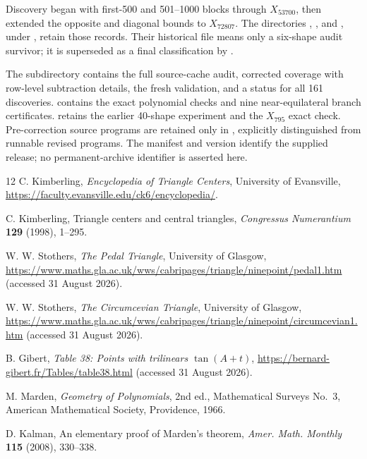 \documentclass[11pt]{article}
\begin{document}
Discovery began with first-500 and 501--1000 blocks through $X_{53700}$,
then extended the opposite and diagonal bounds to $X_{72807}$.
The directories ,
, and , under
, retain those records.  Their historical file
 means only a six-shape audit survivor;
it is superseded as a final classification by
.

The subdirectory  contains the full source-cache
audit, corrected coverage with row-level subtraction details, the fresh
validation, and a status for all 161 discoveries.
 contains the exact polynomial checks and
nine near-equilateral branch certificates.
 retains the earlier 40-shape experiment and the
$X_{795}$ exact check.
Pre-correction source programs are retained only in
, explicitly distinguished from runnable revised
programs.  The manifest and version identify the supplied release;
no permanent-archive identifier is asserted here.

\begin{thebibliography}{12}
\footnotesize
\setlength{\itemsep}{0pt}
C. Kimberling, \emph{Encyclopedia of Triangle Centers}, University of
Evansville, \url{https://faculty.evansville.edu/ck6/encyclopedia/}.

C. Kimberling, Triangle centers and central triangles,
\emph{Congressus Numerantium} \textbf{129} (1998), 1--295.

W. W. Stothers, \emph{The Pedal Triangle}, University of Glasgow,
\url{https://www.maths.gla.ac.uk/wws/cabripages/triangle/ninepoint/pedal1.htm}
(accessed 31 August 2026).

W. W. Stothers, \emph{The Circumcevian Triangle}, University of Glasgow,
\url{https://www.maths.gla.ac.uk/wws/cabripages/triangle/ninepoint/circumcevian1.htm}
(accessed 31 August 2026).

B. Gibert, \emph{Table 38: Points with trilinears $\tan(A+t)$},
\url{https://bernard-gibert.fr/Tables/table38.html}
(accessed 31 August 2026).

M. Marden, \emph{Geometry of Polynomials}, 2nd ed., Mathematical Surveys
No.~3, American Mathematical Society, Providence, 1966.

D. Kalman, An elementary proof of Marden's theorem,
\emph{Amer. Math. Monthly} \textbf{115} (2008), 330--338.

\end{thebibliography}
\end{document}

